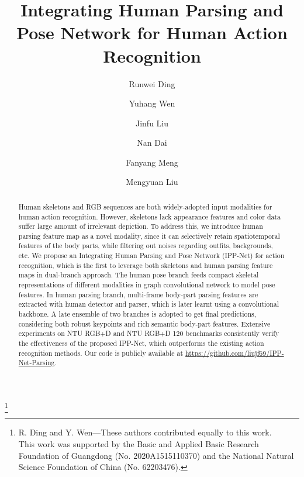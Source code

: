 \documentclass[runningheads]{llncs}
\begin{document}
\title{Integrating Human Parsing and Pose Network for Human Action Recognition}

\def\CICAISubNumber{172}  \begin{comment}
\titlerunning{CICAI2023 submission ID \CICAISubNumber} 
\authorrunning{CICAI2023 submission ID \CICAISubNumber} 
\author{Anonymous CICAI submission}
\institute{Paper ID \CICAISubNumber}
\end{comment}


\author{Runwei Ding \and
Yuhang Wen \and
Jinfu Liu \and
Nan Dai \and
Fanyang Meng \and
Mengyuan Liu\Envelope\inst{)}
}
\maketitle              \footnote{R. Ding and Y. Wen—These authors contributed equally to this work.\\
This work was supported by the Basic and Applied Basic Research Foundation of Guangdong (No. 2020A1515110370) and the National Natural Science Foundation of China (No. 62203476).}
\vspace{-2em}
\begin{abstract}
Human skeletons and RGB sequences are both widely-adopted input modalities for human action recognition. However, skeletons lack appearance features and color data suffer large amount of irrelevant depiction. To address this, we introduce human parsing feature map as a novel modality, since it can selectively retain spatiotemporal features of the body parts, while filtering out noises regarding outfits, backgrounds, etc. We propose an Integrating Human Parsing and Pose Network (IPP-Net) for action recognition, which is the first to leverage both skeletons and human parsing feature maps in dual-branch approach. The human pose branch feeds compact skeletal representations of different modalities in graph convolutional network to model pose features. In human parsing branch, multi-frame body-part parsing features are extracted with human detector and parser, which is later learnt using a convolutional backbone. A late ensemble of two branches is adopted to get final predictions, considering both robust keypoints and rich semantic body-part features. Extensive experiments on NTU RGB+D and NTU RGB+D 120 benchmarks consistently verify the effectiveness of the proposed IPP-Net, which outperforms the existing action recognition methods. Our code is publicly available at \url{https://github.com/liujf69/IPP-Net-Parsing}.

\end{abstract}
\end{document}
